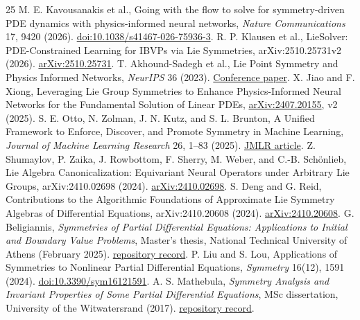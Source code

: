 \documentclass[11pt]{article}
\begin{document}
\begin{thebibliography}{25}\small
{} M. E. Kavousanakis et al., Going with the flow to solve for
symmetry-driven PDE dynamics with physics-informed neural networks,
\emph{Nature Communications} 17, 9420 (2026).
\href{https://doi.org/10.1038/s41467-026-75936-3}{doi:10.1038/s41467-026-75936-3}.
 R. P. Klausen et al., LieSolver: PDE-Constrained Learning
for IBVPs via Lie Symmetries, arXiv:2510.25731v2 (2026).
\href{https://arxiv.org/abs/2510.25731}{arXiv:2510.25731}.
 T. Akhound-Sadegh et al., Lie Point Symmetry and Physics
Informed Networks, \emph{NeurIPS} 36 (2023).
\href{https://papers.nips.cc/paper_files/paper/2023/file/8493c860bec41705f7743d5764301b94-Paper-Conference.pdf}{Conference paper}.
 X. Jiao and F. Xiong, Leveraging Lie Group Symmetries to
Enhance Physics-Informed Neural Networks for the Fundamental Solution of
Linear PDEs, \href{https://arxiv.org/abs/2407.20155}{arXiv:2407.20155}, v2 (2025).
 S. E. Otto, N. Zolman, J. N. Kutz, and S. L. Brunton,
A Unified Framework to Enforce, Discover, and Promote Symmetry in Machine
Learning, \emph{Journal of Machine Learning Research} 26, 1--83 (2025).
\href{https://jmlr.org/papers/v26/24-1315.html}{JMLR article}.
 Z. Shumaylov, P. Zaika, J. Rowbottom, F. Sherry, M. Weber,
and C.-B. Sch\"onlieb, Lie Algebra Canonicalization: Equivariant Neural
Operators under Arbitrary Lie Groups, arXiv:2410.02698 (2024).
\href{https://arxiv.org/abs/2410.02698}{arXiv:2410.02698}.
 S. Deng and G. Reid, Contributions to the Algorithmic
Foundations of Approximate Lie Symmetry Algebras of Differential Equations,
arXiv:2410.20608 (2024).
\href{https://arxiv.org/abs/2410.20608}{arXiv:2410.20608}.
 G. Beligiannis, \emph{Symmetries of Partial
Differential Equations: Applications to Initial and Boundary Value Problems},
Master's thesis, National Technical University of Athens (February 2025).
\href{https://dspace.lib.ntua.gr/xmlui/handle/123456789/62800}{repository record}.
 P. Liu and S. Lou, Applications of Symmetries to Nonlinear
Partial Differential Equations, \emph{Symmetry} 16(12), 1591 (2024).
\href{https://doi.org/10.3390/sym16121591}{doi:10.3390/sym16121591}.
 A. S. Mathebula, \emph{Symmetry Analysis and Invariant
Properties of Some Partial Differential Equations}, MSc dissertation,
University of the Witwatersrand (2017).
\href{https://wiredspace.wits.ac.za/items/b89c36fb-2264-4ce9-b529-c02c1f7e2801}{repository record}.

\end{thebibliography}
\end{document}
